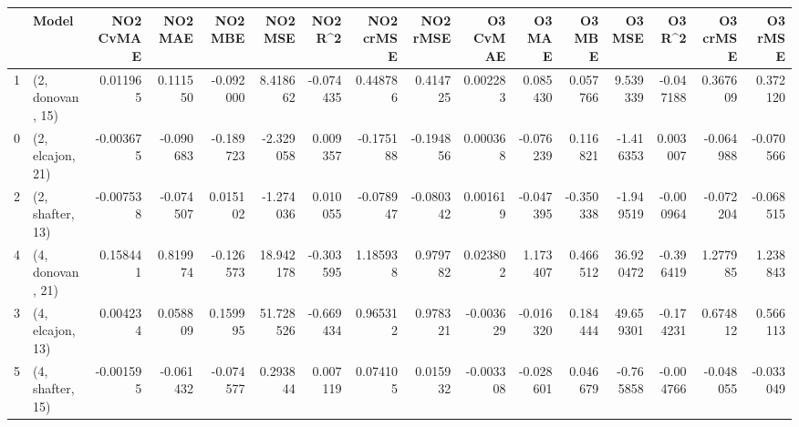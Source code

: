 \begin{tabular}{llrrrrrrrrrrrrrr}
\toprule
{} &             Model &  NO2 CvMAE &   NO2 MAE &   NO2 MBE &    NO2 MSE &   NO2 R\textasciicircum2 &  NO2 crMSE &  NO2 rMSE &  O3 CvMAE &    O3 MAE &    O3 MBE &     O3 MSE &    O3 R\textasciicircum2 &  O3 crMSE &   O3 rMSE \\
\midrule
1 &  (2, donovan, 15) &   0.011965 &  0.111550 & -0.092000 &   8.418662 & -0.074435 &   0.448786 &  0.414725 &  0.002283 &  0.085430 &  0.057766 &   9.539339 & -0.047188 &  0.367609 &  0.372120 \\
0 &  (2, elcajon, 21) &  -0.003675 & -0.090683 & -0.189723 &  -2.329058 &  0.009357 &  -0.175188 & -0.194856 &  0.000368 & -0.076239 &  0.116821 &  -1.416353 &  0.003007 & -0.064988 & -0.070566 \\
2 &  (2, shafter, 13) &  -0.007538 & -0.074507 &  0.015102 &  -1.274036 &  0.010055 &  -0.078947 & -0.080342 &  0.001619 & -0.047395 & -0.350338 &  -1.949519 & -0.000964 & -0.072204 & -0.068515 \\
4 &  (4, donovan, 21) &   0.158441 &  0.819974 & -0.126573 &  18.942178 & -0.303595 &   1.185938 &  0.979782 &  0.023802 &  1.173407 &  0.466512 &  36.920472 & -0.396419 &  1.277985 &  1.238843 \\
3 &  (4, elcajon, 13) &   0.004234 &  0.058809 &  0.159995 &  51.728526 & -0.669434 &   0.965312 &  0.978321 & -0.003629 & -0.016320 &  0.184444 &  49.659301 & -0.174231 &  0.674812 &  0.566113 \\
5 &  (4, shafter, 15) &  -0.001595 & -0.061432 & -0.074577 &   0.293844 &  0.007119 &   0.074105 &  0.015932 & -0.003308 & -0.028601 &  0.046679 &  -0.765858 & -0.004766 & -0.048055 & -0.033049 \\
\bottomrule
\end{tabular}

